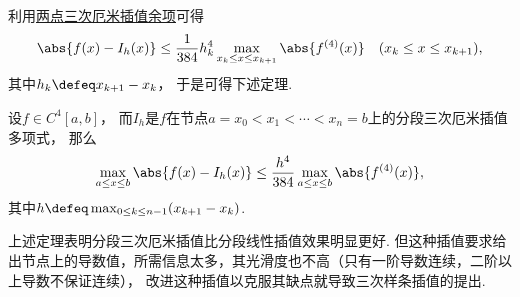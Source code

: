 利用\hyperref[equation:厄米插值.两点三次厄米插值余项]{两点三次厄米插值余项}可得\begin{equation*}
	\abs{f(x) - I_h(x)}
	\leq \frac1{384} h_k^4
	\max_{x_k \leq x \leq x_{k+1}} \abs{f^{(4)}(x)}
	\quad(x_k \leq x \leq x_{k+1}),
\end{equation*}
其中\(h_k \defeq x_{k+1} - x_k\)，
于是可得下述定理.

\begin{theorem}
设\(f \in C^4[a,b]\)，
而\(I_h\)是\(f\)在节点\(a = x_0 < x_1 < \dotsb < x_n = b\)上的分段三次厄米插值多项式，
那么\begin{equation*}
	\max_{a \leq x \leq b} \abs{f(x) - I_h(x)}
	\leq \frac{h^4}{384} \max_{a \leq x \leq b} \abs{f^{(4)}(x)},
\end{equation*}
其中\(h \defeq \max_{0 \leq k \leq n-1}(x_{k+1} - x_k)\).
\end{theorem}

上述定理表明分段三次厄米插值比分段线性插值效果明显更好.
但这种插值要求给出节点上的导数值，所需信息太多，其光滑度也不高（只有一阶导数连续，二阶以上导数不保证连续），
改进这种插值以克服其缺点就导致三次样条插值的提出.
